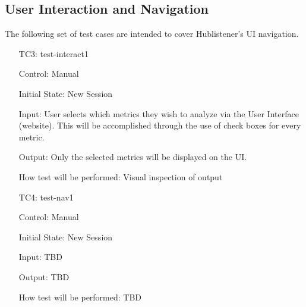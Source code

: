 \documentclass[12pt, titlepage]{article}
\begin{document}
\subsection{User Interaction and Navigation}
The following set of test cases are intended to cover Hublistener's UI navigation. 
\begin{enumerate}
\item[TC3:] test-interact1

Control: Manual
			
Initial State: New Session
					
Input: User selects which metrics they wish to analyze via the User Interface (website). This will be accomplished through the use of check boxes for every metric.
					
Output: Only the selected metrics will be displayed on the UI. 

How test will be performed: Visual inspection of output

\item[TC4:] test-nav1

Control: Manual 
					
Initial State: New Session

Input: TBD 
					
Output: TBD

How test will be performed: TBD

\end{enumerate}
\end{document}
